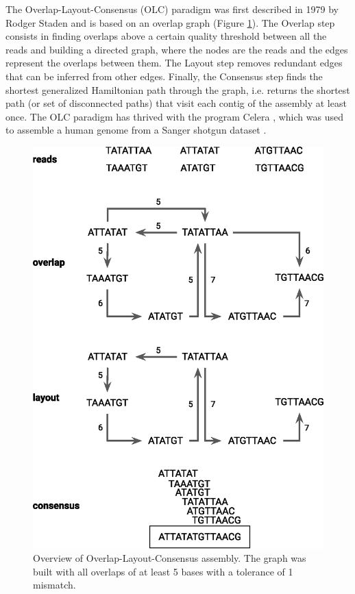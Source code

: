 The Overlap-Layout-Consensus (OLC) paradigm was first described in 1979 by Rodger Staden \cite{olc} and is based on an overlap graph (Figure \ref{fig:olc}). The Overlap step consists in finding overlaps above a certain quality threshold between all the reads and building a directed graph, where the nodes are the reads and the edges represent the overlaps between them. The Layout step removes redundant edges that can be inferred from other edges. Finally, the Consensus step finds the shortest generalized Hamiltonian path through the graph, i.e. returns the shortest path (or set of disconnected paths) that visit each contig of the assembly at least once. The OLC paradigm has thrived with the program Celera \cite{celera}, which was used to assemble a human genome from a Sanger shotgun dataset \cite{venter2001}. \\

\begin{figure}
    \centering
    \includegraphics[width=\textwidth]{fig/review_olc.eps}
    \caption{Overview of Overlap-Layout-Consensus assembly. The graph was built with all overlaps of at least 5 bases with a tolerance of 1 mismatch. }
    \label{fig:olc}
\end{figure}


